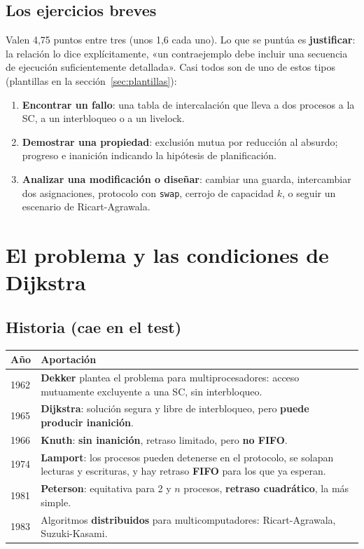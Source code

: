 \documentclass[11pt,a4paper,oneside]{report}
\begin{document}
\subsection{Los ejercicios breves}
Valen 4,75 puntos entre tres (unos 1,6 cada uno). Lo que se puntúa es \textbf{justificar}: la relación lo dice
explícitamente, «un contraejemplo debe incluir una secuencia de ejecución suficientemente detallada». Casi todos
son de uno de estos tipos (plantillas en la sección~\ref{sec:plantillas}):
\begin{enumerate}[leftmargin=*]
  \item \textbf{Encontrar un fallo}: una tabla de intercalación que lleva a dos procesos a la SC, a un
        interbloqueo o a un livelock.
  \item \textbf{Demostrar una propiedad}: exclusión mutua por reducción al absurdo; progreso e inanición
        indicando la hipótesis de planificación.
  \item \textbf{Analizar una modificación o diseñar}: cambiar una guarda, intercambiar dos asignaciones,
        protocolo con \texttt{swap}, cerrojo de capacidad $k$, o seguir un escenario de Ricart-Agrawala.
\end{enumerate}

\clearpage
\section{El problema y las condiciones de Dijkstra}

\subsection{Historia (cae en el test)}
\begin{center}\small
\begin{tabular}{lp{11.5cm}}
\toprule
\textbf{Año} & \textbf{Aportación} \\ \midrule
1962 & \textbf{Dekker} plantea el problema para multiprocesadores: acceso mutuamente excluyente a una SC, sin interbloqueo. \\
1965 & \textbf{Dijkstra}: solución segura y libre de interbloqueo, pero \textbf{puede producir inanición}. \\
1966 & \textbf{Knuth}: \textbf{sin inanición}, retraso limitado, pero \textbf{no FIFO}. \\
1974 & \textbf{Lamport}: los procesos pueden detenerse en el protocolo, se solapan lecturas y escrituras, y hay retraso \textbf{FIFO} para los que ya esperan. \\
1981 & \textbf{Peterson}: equitativa para 2 y $n$ procesos, \textbf{retraso cuadrático}, la más simple. \\
1983 & Algoritmos \textbf{distribuidos} para multicomputadores: Ricart-Agrawala, Suzuki-Kasami. \\
\bottomrule
\end{tabular}
\end{center}
\end{document}
